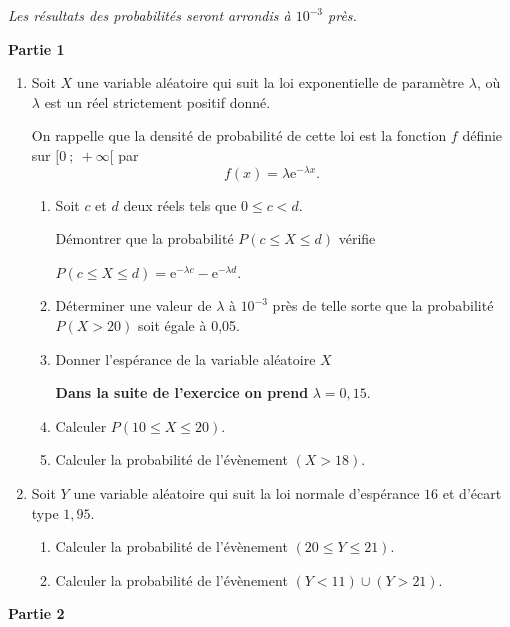 \documentclass[12pt,french]{article}
\begin{document}
\begin{question}[subtitle={Métropole 2015}]
\emph{Les résultats des probabilités seront arrondis à $10^{-3}$ près.}

\bigskip

\textbf{Partie 1}

\medskip

\begin{enumerate}
\item Soit $X$ une variable aléatoire qui suit la loi exponentielle de paramètre $\lambda$, où $\lambda$ est un réel strictement positif donné.

On rappelle que la densité de probabilité de cette loi est la fonction $f$  définie sur
$[0~;~+ \infty[$ par
\[f(x) = \lambda\text{e}^{- \lambda x}.\]

\begin{enumerate}
  \item Soit $c$ et $d$ deux réels tels que $0 \leqslant c < d$.

Démontrer que la probabilité $P( c \leqslant X \leqslant d)$ vérifie 

$P(c \leqslant X \leqslant d) = \text{e}^{- \lambda c}   - \text{e}^{- \lambda d}$.
    \item Déterminer une valeur de $\lambda$ à $10^{-3}$ près de telle sorte
      que la probabilité $P(X > 20)$ soit égale à 0,05.
    \item Donner l'espérance de la variable aléatoire $X$

\medskip

\textbf{Dans la suite de l'exercice on prend } \boldmath$\lambda = 0,15$\unboldmath.
    \item Calculer $P(10 \leqslant X \leqslant 20)$.
    \item Calculer la probabilité de l'évènement $(X > 18)$.
  \end{enumerate}
\item Soit $Y$ une variable aléatoire qui suit la loi normale d'espérance $16$ et d'écart type $1,95$.
  \begin{enumerate}
    \item Calculer la probabilité de l'évènement $(20 \leqslant Y \leqslant 21)$.
    \item Calculer la probabilité de l'évènement $(Y < 11) \cup (Y > 21)$.
  \end{enumerate}
\end{enumerate}

\bigskip

\textbf{Partie 2}


\end{question}
\end{document}
